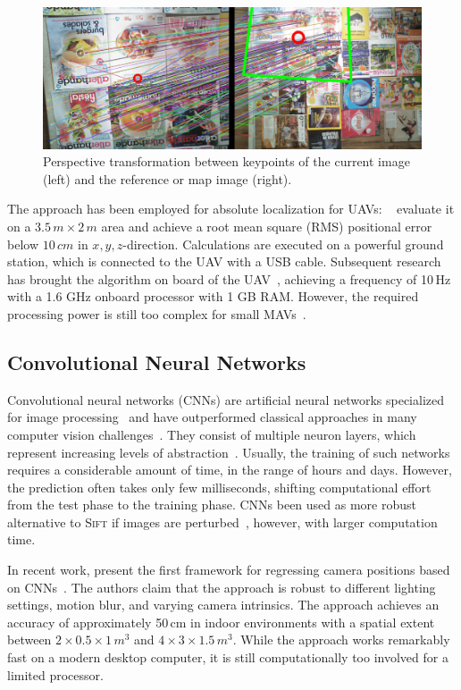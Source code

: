 \documentclass{report}
\begin{document}

\begin{figure}[h!]
\begin{center}
\includegraphics[width=0.448\columnwidth]{sift}
\caption{{Perspective transformation between keypoints of the current image (left) and the reference or map image (right).%
}}
\end{center}
\end{figure}

The approach has been employed for absolute localization for UAVs:
\citeauthor{blosch2010vision}~\cite{blosch2010vision} evaluate it on a
$3.5\,m \times 2\,m$ area and achieve a root mean square (RMS)
positional error below $10\,cm$ in $x,y,z$-direction. Calculations are
executed on a powerful ground station, which is connected to the UAV
with a USB cable. Subsequent research has brought the algorithm on
board of the UAV~\cite{achtelik2011onboard}, achieving a frequency of
10\,Hz with a 1.6 GHz onboard processor with 1 GB RAM. However, the
required processing power is still too complex for small
MAVs~\cite{de2009design}.

\subsection{Convolutional Neural Networks}

Convolutional neural networks (CNNs) are artificial neural networks
specialized for image processing~\cite{lecun1998gradient} and have
outperformed classical approaches in many computer vision
challenges~\cite{dosovitskiy2014discriminative}. They consist of
multiple neuron layers, which represent increasing levels of
abstraction~\cite{lecun1998gradient}. Usually, the training of such
networks requires a considerable amount of time, in the range of hours
and days. However, the prediction often takes only few milliseconds,
shifting computational effort from the test phase to the training
phase. CNNs been used as more robust alternative to \textsc{Sift} if
images are perturbed~\cite{dosovitskiy2014discriminative}, however,
with larger computation time.

In recent work, \citeauthor{kendall2015posenet} present the first
framework for regressing camera positions based on
CNNs~\cite{kendall2015posenet}. The authors claim that the approach is
robust to different lighting settings, motion blur, and varying camera
intrinsics.  The approach achieves an accuracy of approximately 50\,cm
in indoor environments with a spatial extent between
$2 \times 0.5 \times 1\,m^3$ and $4 \times 3 \times 1.5\,m^3$. While
the approach works remarkably fast on a modern desktop computer, it is
still computationally too involved for a limited processor.
\end{document}
